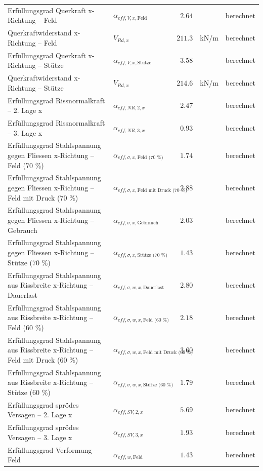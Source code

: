 \documentclass[11pt,a4paper]{article}
\begin{document}
\begin{xltabular}{\linewidth}{>{\raggedright\arraybackslash}Xlrll}
Erfüllungsgrad Querkraft x-Richtung – Feld & $\alpha_{eff,V,x,\text{Feld}}$ & $2.64$ &  & berechnet \\
Querkraftwiderstand x-Richtung – Feld & $V_{Rd,x}$ & $211.3$ & kN/m & berechnet \\
Erfüllungsgrad Querkraft x-Richtung – Stütze & $\alpha_{eff,V,x,\text{Stütze}}$ & $3.58$ &  & berechnet \\
Querkraftwiderstand x-Richtung – Stütze & $V_{Rd,x}$ & $214.6$ & kN/m & berechnet \\
Erfüllungsgrad Rissnormalkraft – 2. Lage x & $\alpha_{eff,NR,2,x}$ & $2.47$ &  & berechnet \\
Erfüllungsgrad Rissnormalkraft – 3. Lage x & $\alpha_{eff,NR,3,x}$ & $0.93$ &  & berechnet \\
Erfüllungsgrad Stahlspannung gegen Fliessen x-Richtung – Feld (70 \%) & $\alpha_{eff,\sigma,x,\text{Feld (70 \%)}}$ & $1.74$ &  & berechnet \\
Erfüllungsgrad Stahlspannung gegen Fliessen x-Richtung – Feld mit Druck (70 \%) & $\alpha_{eff,\sigma,x,\text{Feld mit Druck (70 \%)}}$ & $2.88$ &  & berechnet \\
Erfüllungsgrad Stahlspannung gegen Fliessen x-Richtung – Gebrauch & $\alpha_{eff,\sigma,x,\text{Gebrauch}}$ & $2.03$ &  & berechnet \\
Erfüllungsgrad Stahlspannung gegen Fliessen x-Richtung – Stütze (70 \%) & $\alpha_{eff,\sigma,x,\text{Stütze (70 \%)}}$ & $1.43$ &  & berechnet \\
Erfüllungsgrad Stahlspannung aus Rissbreite x-Richtung – Dauerlast & $\alpha_{eff,\sigma,w,x,\text{Dauerlast}}$ & $2.80$ &  & berechnet \\
Erfüllungsgrad Stahlspannung aus Rissbreite x-Richtung – Feld (60 \%) & $\alpha_{eff,\sigma,w,x,\text{Feld (60 \%)}}$ & $2.18$ &  & berechnet \\
Erfüllungsgrad Stahlspannung aus Rissbreite x-Richtung – Feld mit Druck (60 \%) & $\alpha_{eff,\sigma,w,x,\text{Feld mit Druck (60 \%)}}$ & $3.60$ &  & berechnet \\
Erfüllungsgrad Stahlspannung aus Rissbreite x-Richtung – Stütze (60 \%) & $\alpha_{eff,\sigma,w,x,\text{Stütze (60 \%)}}$ & $1.79$ &  & berechnet \\
Erfüllungsgrad sprödes Versagen – 2. Lage x & $\alpha_{eff,SV,2,x}$ & $5.69$ &  & berechnet \\
Erfüllungsgrad sprödes Versagen – 3. Lage x & $\alpha_{eff,SV,3,x}$ & $1.93$ &  & berechnet \\
Erfüllungsgrad Verformung – Feld & $\alpha_{eff,w,\text{Feld}}$ & $1.43$ &  & berechnet \\

\end{xltabular}
\end{document}
